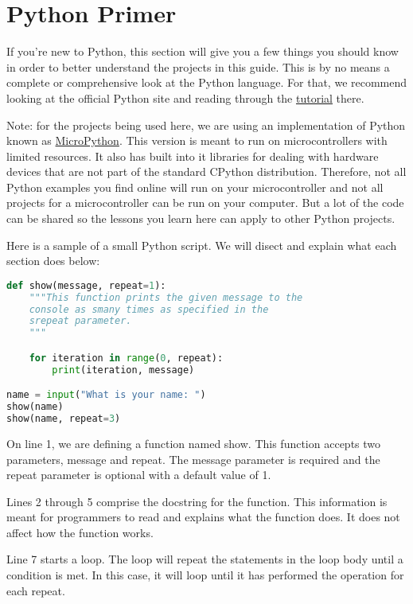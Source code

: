 \chapter{Python Primer}
If you're new to Python, this section will give you a few things you should know
in order to better understand the projects in this guide. This is by no means a
complete or comprehensive look at the Python language. For that, we recommend looking
at the official Python site and reading through the \href{https://docs.python.org/3/tutorial/}{tutorial}
there.

\begin{tcolorbox}
    Note: for the projects being used here, we are using an implementation of
    Python known as \href{https://micropython.org/}{MicroPython}. This version
    is meant to run on microcontrollers with limited resources. It
    also has built into it libraries for dealing with hardware devices that are
    not part of the standard CPython distribution. Therefore, not all Python examples
    you find online will run on your microcontroller and not all projects for a
    microcontroller can be run on your computer. But a lot of the code can be shared
    so the lessons you learn here can apply to other Python projects.
\end{tcolorbox}

Here is a sample of a small Python script. We will disect and explain what each
section does below:

\begin{lstlisting}[language=Python,caption=An example Python script]
def show(message, repeat=1):
    """This function prints the given message to the
    console as smany times as specified in the
    srepeat parameter.
    """

    for iteration in range(0, repeat):
        print(iteration, message)

name = input("What is your name: ")
show(name)
show(name, repeat=3)
\end{lstlisting}

On line 1, we are defining a function named show. This function accepts two parameters,
message and repeat. The message parameter is required and the repeat parameter
is optional with a default value of 1.

Lines 2 through 5 comprise the docstring for the function. This information is meant
for programmers to read and explains what the function does. It does not affect how
the function works.

Line 7 starts a loop. The loop will repeat the statements in the loop body until
a condition is met. In this case, it will loop until it has performed the operation
for each repeat.

